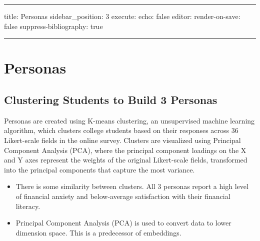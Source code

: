 \documentclass[
  letterpaper,
  DIV=11,
  numbers=noendperiod]{scrartcl}
\begin{document}
\begin{center}\rule{0.5\linewidth}{0.5pt}\end{center}

title: Personas sidebar\_position: 3 execute: echo: false editor:
render-on-save: false suppress-bibliography: true

\begin{center}\rule{0.5\linewidth}{0.5pt}\end{center}

\section{Personas}\label{personas}

\subsection{Clustering Students to Build 3
Personas}\label{clustering-students-to-build-3-personas}

Personas are created using K-means clustering, an unsupervised machine
learning algorithm, which clusters college students based on their
responses across 36 Likert-scale fields in the online survey. Clusters
are visualized using Principal Component Analysis (PCA), where the
principal component loadings on the X and Y axes represent the weights
of the original Likert-scale fields, transformed into the principal
components that capture the most variance.

\begin{itemize}
\item
  There is some similarity between clusters. All 3 personas report a
  high level of financial anxiety and below-average satisfaction with
  their financial literacy.
\item
  Principal Component Analysis (PCA) is used to convert data to lower
  dimension space. This is a predecessor of embeddings.
\end{itemize}
\end{document}
